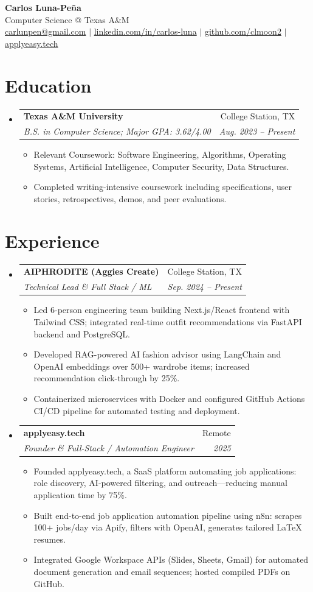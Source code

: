 \documentclass[letterpaper,11pt]{article}
\makeatletter
\newcommand{\resumeItem}[1]{
  \item\small{{#1 \vspace{-2pt}}}
}
\newcommand{\resumeSubheading}[4]{
  \vspace{-2pt}\item
  \begin{tabular*}{0.97\textwidth}[t]{l@{\extracolsep{\fill}}r}
    \textbf{#1} & #2 \\
    \textit{\small#3} & \textit{\small #4} \\
  \end{tabular*}\vspace{-7pt}
}
\newcommand{\resumeSubHeadingListStart}{\begin{itemize}[leftmargin=0.15in, label={}]}
\newcommand{\resumeSubHeadingListEnd}{\end{itemize}}
\newcommand{\resumeItemListStart}{\begin{itemize}}
\newcommand{\resumeItemListEnd}{\end{itemize}\vspace{-5pt}}
\makeatother
\begin{document}
\begin{center}
\textbf{\LARGE Carlos Luna-Peña} \\ \vspace{1pt}
Computer Science @ Texas A\&M \\ \vspace{1pt}
\href{mailto:carlunpen@gmail.com}{carlunpen@gmail.com} $|$ \href{https://linkedin.com/in/carlos-luna}{linkedin.com/in/carlos-luna} $|$ \href{https://github.com/clmoon2}{github.com/clmoon2} $|$ \href{https://applyeasy.tech}{applyeasy.tech}
\end{center}

\section{Education}
\resumeSubHeadingListStart
\resumeSubheading
{Texas A\&M University}{College Station, TX}
{B.S. in Computer Science; Major GPA: 3.62/4.00}{Aug. 2023 -- Present}
\resumeItemListStart
\resumeItem{Relevant Coursework: Software Engineering, Algorithms, Operating Systems, Artificial Intelligence, Computer Security, Data Structures.}
\resumeItem{Completed writing-intensive coursework including specifications, user stories, retrospectives, demos, and peer evaluations.}
\resumeItemListEnd
\resumeSubHeadingListEnd

\section{Experience}
\resumeSubHeadingListStart

\resumeSubheading
{AIPHRODITE (Aggies Create)}{College Station, TX}
{Technical Lead \& Full Stack / ML}{Sep. 2024 -- Present}
\resumeItemListStart
\resumeItem{Led 6-person engineering team building Next.js/React frontend with Tailwind CSS; integrated real-time outfit recommendations via FastAPI backend and PostgreSQL.}
\resumeItem{Developed RAG-powered AI fashion advisor using LangChain and OpenAI embeddings over 500+ wardrobe items; increased recommendation click-through by 25\%.}
\resumeItem{Containerized microservices with Docker and configured GitHub Actions CI/CD pipeline for automated testing and deployment.}
\resumeItemListEnd

\resumeSubheading
{applyeasy.tech}{Remote}
{Founder \& Full-Stack / Automation Engineer}{2025}
\resumeItemListStart
\resumeItem{Founded applyeasy.tech, a SaaS platform automating job applications: role discovery, AI-powered filtering, and outreach—reducing manual application time by 75\%.}
\resumeItem{Built end-to-end job application automation pipeline using n8n: scrapes 100+ jobs/day via Apify, filters with OpenAI, generates tailored LaTeX resumes.}
\resumeItem{Integrated Google Workspace APIs (Slides, Sheets, Gmail) for automated document generation and email sequences; hosted compiled PDFs on GitHub.}
\resumeItemListEnd
\resumeSubHeadingListEnd
\end{document}
